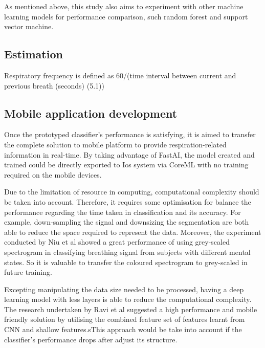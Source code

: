 As mentioned above, this study also aims to experiment with other machine learning models for performance comparison, such random forest and support vector machine. 

\subsection{Estimation}
Respiratory frequency is defined as 60/(time interval between current and previous breath (seconds) (5.1))\cite{Mason2002SignalMonitoring}

\subsection{Mobile application development}
Once the prototyped classifier's performance is satisfying, it is aimed to transfer the complete solution to mobile platform to provide respiration-related information in real-time. By taking advantage of FastAI, the model created and trained could be directly exported to Ios system via CoreML with no training required on the mobile devices.

Due to the limitation of resource in computing, computational complexity should be taken into account. Therefore, it requires some optimisation for balance the performance regarding the time taken in classification and its accuracy. For example, down-sampling the signal and downsizing the segmentation are both able to reduce the space required to represent the data. Moreover, the experiment conducted by Niu et al showed a great performance of using grey-scaled spectrogram in classifying breathing signal from subjects with different mental states.\cite{Niu2019AState} So it is valuable to transfer the coloured spectrogram to grey-scaled in future training. 

Excepting manipulating the data size needed to be processed, having a deep learning model with less layers is able to reduce the computational complexity. The research undertaken by Ravi et al suggested a high performance and mobile friendly solution by utilising the combined feature set of features learnt from CNN and shallow features.\cite{Ravi2017ADevices}sThis approach would be take into account if the classifier's performance drops after adjust its structure.




